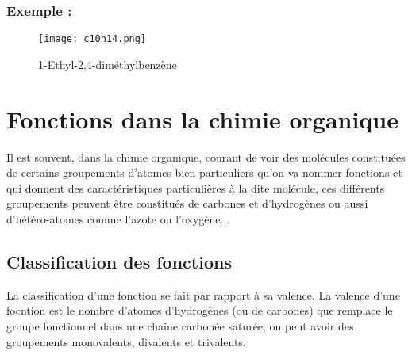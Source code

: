 \documentclass[a4paper, oneside]{book}
\begin{document}
\subsubsection{Exemple :}
\begin{figure}[h]
    \centering
    \texttt{[image: c10h14.png]}
    \caption{1-Ethyl-2,4-diméthylbenzène}
    \label{1-Ethyl-2,4-diméthylbenzène}
\end{figure}
\section{Fonctions dans la chimie organique}
Il est souvent, dans la chimie organique, courant de voir des molécules constituées de certains groupements d'atomes bien particuliers qu'on va nommer fonctions et qui donnent des caractéristiques particulières à la dite molécule, ces différents groupements peuvent être constitués de carbones et d'hydrogènes ou aussi d'hétéro-atomes comme l'azote ou l'oxygène...
\subsection{Classification des fonctions}
La classification d'une fonction se fait par rapport à sa valence. La valence d'une focntion est le nombre d'atomes d'hydrogènes (ou de carbones) que remplace le groupe fonctionnel dans une chaîne carbonée saturée, on peut avoir des groupements monovalents, divalents et trivalents. 
\end{document}
